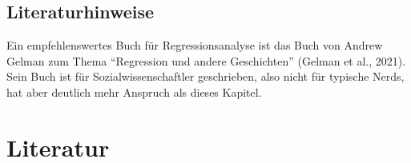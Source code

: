 \documentclass[
  letterpaper,
  oneside,
  open=any]{scrbook}
\theoremstyle{definition}
\theoremstyle{definition}
\theoremstyle{definition}
\theoremstyle{remark}
\begin{document}
\section{Literaturhinweise}\label{literaturhinweise-8}

Ein empfehlenswertes Buch für Regressionsanalyse ist das Buch von Andrew
Gelman zum Thema \enquote{Regression und andere Geschichten} (Gelman et
al., 2021). Sein Buch ist für Sozialwissenschaftler geschrieben, also
nicht für typische Nerds, hat aber deutlich mehr Anspruch als dieses
Kapitel.

\chapter*{Literatur}\label{literatur}

\end{document}

